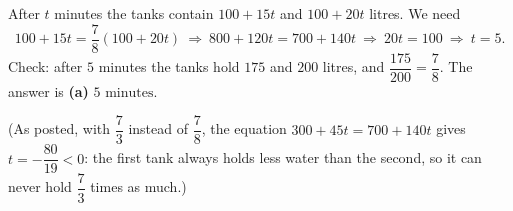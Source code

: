After $t$ minutes the tanks contain $100+15t$ and $100+20t$ litres. We need
\[
100+15t=\dfrac{7}{8}(100+20t)\ \Longrightarrow\ 800+120t=700+140t\ \Longrightarrow\ 20t=100\ \Longrightarrow\ t=5 .
\]
Check: after $5$ minutes the tanks hold $175$ and $200$ litres, and $\dfrac{175}{200}=\dfrac{7}{8}$. The answer is \textbf{(a)} $\boxed{5\text{ minutes}}$.

(As posted, with $\dfrac{7}{3}$ instead of $\dfrac{7}{8}$, the equation $300+45t=700+140t$ gives $t=-\dfrac{80}{19}<0$: the first tank always holds less water than the second, so it can never hold $\dfrac{7}{3}$ times as much.)
